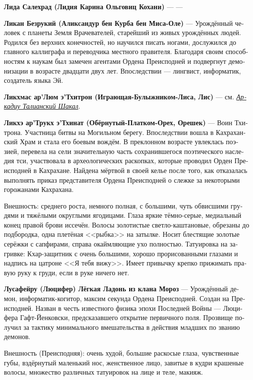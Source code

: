 \documentclass[a4paper,12pt,fleqn]{book}\usepackage{polyglossia}\setdefaultlanguage[babelshorthands=true]{russian}\setotherlanguage{english}\defaultfontfeatures{Ligatures=TeX,Mapping=tex-text}\usepackage{xcolor}\newcommand{\ml}[3]{#2}
\newcommand{\theterm}[3]{\textbf{\hypertarget{#1}{#2}} --- #3}
\newcommand{\thesynonim}[3]{\textbf{#2} --- см. \textit{\hyperlink{#1}{#3}}.}
\begin{document}
{\theterm{lida}
{Лида Салехрад (Лидия Карина Ольговиц Кохани)}
{---}

\theterm{lican}
{Ликан Безрукий (Аликсандур бен Курба бен Миса-Оле)}
{Урождённый человек с планеты Земля Врачевателей, старейший из живых урождённых людей.
Родился без верхних конечностей, но научился писать ногами, дослужился до главного каллиграфа и переводчика местного правителя.
Благодаря своим способностям к наукам был замечен агентами Ордена Преисподней и подвергнут демонизации в возрасте двадцати двух лет.
Впоследствии --- лингвист, информатик, создатель языка Эй.}

\thesynonim{arcadiju}
{Ликхмас ар’Люм э’Тхитрон (Играющая-Булыжником-Лиса, Лис)}
{Аркадиу Талианский Шакал}

\theterm{likchoe} %
{Ликхэ ар’Трукх э’Тхинат (Обёрнутый-Платком-Орех, Орешек)}
{Воин Тхитрона.
Участница битвы на Могильном берегу.
Впоследствии вошла в Кахраханский Храм и стала его боевым вождём.
В преклонном возрасте увлеклась поэзией, перевела на сели значительную часть сохранившегося поэтического наследия тси, участвовала в археологических раскопках, которые проводил Орден Преисподней в Кахрахане.
Найдена мёртвой в своей келье после того, как отказалась выполнять приказ представителя Ордена Преисподней о слежке за некоторыми горожанами Кахрахана.

Внешность: среднего роста, немного полная, с большими, чуть обвисшими грудями и тяжёлыми округлыми ягодицами.
Глаза яркие тёмно-серые, медиальный конец правой брови иссечён.
Волосы золотистые светло-каштановые, обрезаны до подбородка, одна плетёная <<рыбка>> на затылке.
Носит блестящие золотые серёжки с сапфирами, справа окаймляющие ухо полностью.
Татуировка на загривке: Кхар-защитник с очень большими, хорошо прорисованными глазами и надпись на цатроне <<Я тебя вижу>>.
Имеет привычку крепко прижимать правую руку к груди, если в руке ничего нет.}

\theterm{lusafejru} %
{Лусафейру (Люцифер) Лёгкая Ладонь из клана Мороз}
{Урождённый демон, информатик-когитор, максим секунда Ордена Преисподней.
Создан на Преисподней.
Назван в честь известного физика эпохи Последней Войны --- Люцифера Гафт-Йенковски, предсказавшего открытие первичного поля.
Прозвище получил за тактику минимального вмешательства в действия младших по званию демонов.

Внешность (Преисподняя): очень худой, большие раскосые глаза, чувственные губы, вздёрнутый маленький нос, женственное лицо, завитые в кудри крашеные волосы, множество различных татуировок на лице и теле, макияж.}

}
\end{document}
